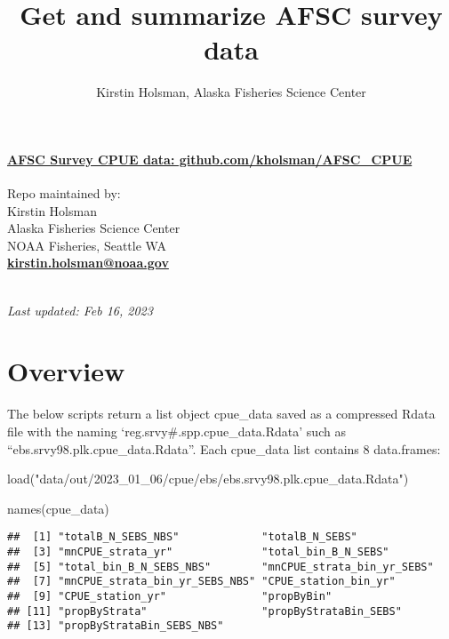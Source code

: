 \documentclass[
]{article}
\title{Get and summarize AFSC survey data}
\author{Kirstin Holsman, Alaska Fisheries Science Center}
\date{}
\newenvironment{Shaded}{\begin{snugshade}}{\end{snugshade}}
\newcommand{\FunctionTok}[1]{\textcolor[rgb]{0.00,0.00,0.00}{#1}}
\newcommand{\NormalTok}[1]{#1}
\newcommand{\StringTok}[1]{\textcolor[rgb]{0.31,0.60,0.02}{#1}}
\begin{document}
\maketitle

{
\setcounter{tocdepth}{2}
\tableofcontents
}
\hypertarget{afsc-survey-cpue-data-github.comkholsmanafsc_cpue}{%
\paragraph{\texorpdfstring{\href{https://github.com/kholsman/AFSC_CPUE}{\textbf{AFSC
Survey CPUE data:
github.com/kholsman/AFSC\_CPUE}}}{AFSC Survey CPUE data: github.com/kholsman/AFSC\_CPUE}}\label{afsc-survey-cpue-data-github.comkholsmanafsc_cpue}}

Repo maintained by:\\
Kirstin Holsman\\
Alaska Fisheries Science Center\\
NOAA Fisheries, Seattle WA\\
\textbf{\url{kirstin.holsman@noaa.gov}}\strut \\
\emph{Last updated: Feb 16, 2023}

\hypertarget{overview}{%
\section{Overview}\label{overview}}

The below scripts return a list object cpue\_data saved as a compressed
Rdata file with the naming `reg.srvy\#.spp.cpue\_data.Rdata' such as
``ebs.srvy98.plk.cpue\_data.Rdata''. Each cpue\_data list contains 8
data.frames:

\begin{Shaded}
\begin{Highlighting}[]
\FunctionTok{load}\NormalTok{(}\StringTok{"data/out/2023\_01\_06/cpue/ebs/ebs.srvy98.plk.cpue\_data.Rdata"}\NormalTok{)}

\FunctionTok{names}\NormalTok{(cpue\_data)}
\end{Highlighting}
\end{Shaded}

\begin{verbatim}
##  [1] "totalB_N_SEBS_NBS"             "totalB_N_SEBS"                
##  [3] "mnCPUE_strata_yr"              "total_bin_B_N_SEBS"           
##  [5] "total_bin_B_N_SEBS_NBS"        "mnCPUE_strata_bin_yr_SEBS"    
##  [7] "mnCPUE_strata_bin_yr_SEBS_NBS" "CPUE_station_bin_yr"          
##  [9] "CPUE_station_yr"               "propByBin"                    
## [11] "propByStrata"                  "propByStrataBin_SEBS"         
## [13] "propByStrataBin_SEBS_NBS"
\end{verbatim}
\end{document}
